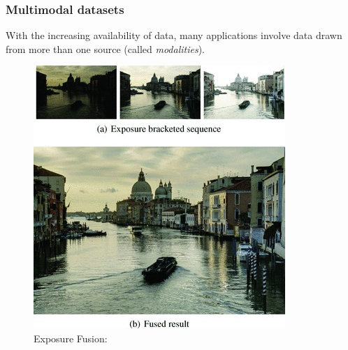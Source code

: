\documentclass{beamer}
\begin{document}
\begin{frame}
  \frametitle{Multimodal datasets}
  With the increasing availability of data, many applications involve data drawn from more than one source (called \emph{modalities}).
  \begin{figure}
    \hfill
    \begin{minipage}[b]{0.38\linewidth}
      \centering
      \includegraphics[width=\textwidth]{./Images/Exposure-Fusion.png}
      \caption{Exposure Fusion: \cite{Mertens2008}}
    \end{minipage}
    \hfill
    \begin{minipage}[b]{0.38\linewidth}
      \centering

\end{minipage}
\end{figure}
\end{frame}
\end{document}
